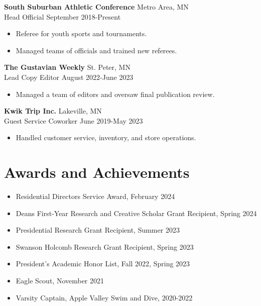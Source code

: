 \documentclass[10pt]{article}
\begin{document}
\textbf{South Suburban Athletic Conference} \hfill Metro Area, MN \\
Head Official \hfill September 2018-Present
\begin{itemize}
    \item Referee for youth sports and tournaments.
    \item Managed teams of officials and trained new referees.
\end{itemize}

\textbf{The Gustavian Weekly} \hfill St. Peter, MN \\
Lead Copy Editor \hfill August 2022-June 2023
\begin{itemize}
    \item Managed a team of editors and oversaw final publication review.
\end{itemize}

\textbf{Kwik Trip Inc.} \hfill Lakeville, MN \\
Guest Service Coworker \hfill June 2019-May 2023
\begin{itemize}
    \item Handled customer service, inventory, and store operations.
\end{itemize}

\vspace{0.1in}

\section*{Awards and Achievements}
\vspace{-0.05in}

\begin{itemize}
    \item Residential Directors Service Award, February 2024
    \item Deans First-Year Research and Creative Scholar Grant Recipient, Spring 2024
    \item Presidential Research Grant Recipient, Summer 2023
    \item Swanson Holcomb Research Grant Recipient, Spring 2023
    \item President’s Academic Honor List, Fall 2022, Spring 2023
    \item Eagle Scout, November 2021
    \item Varsity Captain, Apple Valley Swim and Dive, 2020-2022
\end{itemize}
\end{document}
